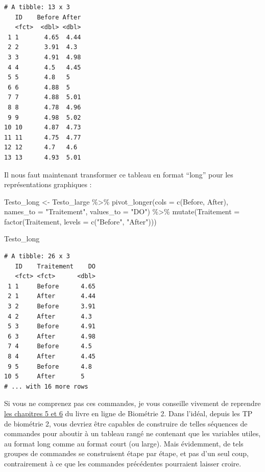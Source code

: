 \documentclass[
  a4paper,
]{article}
\newenvironment{Shaded}{\begin{snugshade}}{\end{snugshade}}
\newcommand{\AttributeTok}[1]{\textcolor[rgb]{0.00,0.34,0.68}{#1}}
\newcommand{\FunctionTok}[1]{\textcolor[rgb]{0.39,0.29,0.61}{#1}}
\newcommand{\NormalTok}[1]{\textcolor[rgb]{0.12,0.11,0.11}{#1}}
\newcommand{\OtherTok}[1]{\textcolor[rgb]{0.00,0.43,0.16}{#1}}
\newcommand{\SpecialCharTok}[1]{\textcolor[rgb]{0.24,0.68,0.91}{#1}}
\newcommand{\StringTok}[1]{\textcolor[rgb]{0.75,0.01,0.01}{#1}}
\begin{document}
\begin{verbatim}
# A tibble: 13 x 3
   ID    Before After
   <fct>  <dbl> <dbl>
 1 1       4.65  4.44
 2 2       3.91  4.3 
 3 3       4.91  4.98
 4 4       4.5   4.45
 5 5       4.8   5   
 6 6       4.88  5   
 7 7       4.88  5.01
 8 8       4.78  4.96
 9 9       4.98  5.02
10 10      4.87  4.73
11 11      4.75  4.77
12 12      4.7   4.6 
13 13      4.93  5.01
\end{verbatim}

Il nous faut maintenant transformer ce tableau en format ``long'' pour les représentations graphiques :

\begin{Shaded}
\begin{Highlighting}[]
\NormalTok{Testo\_long }\OtherTok{\textless{}{-}}\NormalTok{ Testo\_large }\SpecialCharTok{\%\textgreater{}\%} 
  \FunctionTok{pivot\_longer}\NormalTok{(}\AttributeTok{cols =} \FunctionTok{c}\NormalTok{(Before, After),}
               \AttributeTok{names\_to =} \StringTok{"Traitement"}\NormalTok{, }
               \AttributeTok{values\_to =} \StringTok{"DO"}\NormalTok{) }\SpecialCharTok{\%\textgreater{}\%} 
  \FunctionTok{mutate}\NormalTok{(}\AttributeTok{Traitement =} \FunctionTok{factor}\NormalTok{(Traitement, }\AttributeTok{levels =} \FunctionTok{c}\NormalTok{(}\StringTok{"Before"}\NormalTok{, }\StringTok{"After"}\NormalTok{)))}

\NormalTok{Testo\_long}
\end{Highlighting}
\end{Shaded}

\begin{verbatim}
# A tibble: 26 x 3
   ID    Traitement    DO
   <fct> <fct>      <dbl>
 1 1     Before      4.65
 2 1     After       4.44
 3 2     Before      3.91
 4 2     After       4.3 
 5 3     Before      4.91
 6 3     After       4.98
 7 4     Before      4.5 
 8 4     After       4.45
 9 5     Before      4.8 
10 5     After       5   
# ... with 16 more rows
\end{verbatim}

Si vous ne comprenez pas ces commandes, je vous conseille vivement de reprendre \href{https://besibo.github.io/DA/tidyr.html}{les chapitres 5 et 6} du livre en ligne de Biométrie 2. Dans l'idéal, depuis les TP de biométrie 2, vous devriez être capables de construire de telles séquences de commandes pour aboutir à un tableau rangé ne contenant que les variables utiles, au format long comme au format court (ou large). Mais évidemment, de tels groupes de commandes se construisent étape par étape, et pas d'un seul coup, contrairement à ce que les commandes précédentes pourraient laisser croire.
\end{document}
